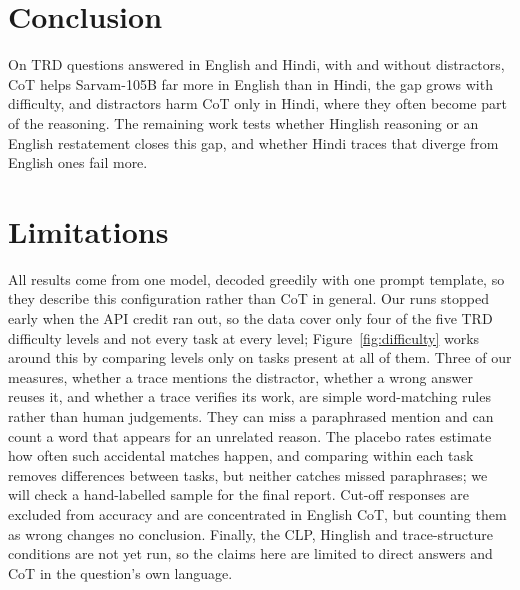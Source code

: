 \documentclass[11pt]{article}
\begin{document}
\section{Conclusion}
\label{sec:conclusion}

On \NQuestions{} TRD questions answered in English and Hindi, with and without distractors, CoT helps Sarvam-105B far more in English than in Hindi, the gap grows with difficulty, and distractors harm CoT only in Hindi, where they often become part of the reasoning. The remaining work tests whether Hinglish reasoning or an English restatement closes this gap, and whether Hindi traces that diverge from English ones fail more.

\section*{Limitations}

All results come from one model, decoded greedily with one prompt template, so they describe this configuration rather than CoT in general. Our runs stopped early when the API credit ran out, so the data cover only four of the five TRD difficulty levels and not every task at every level; Figure~\ref{fig:difficulty} works around this by comparing levels only on tasks present at all of them. Three of our measures, whether a trace mentions the distractor, whether a wrong answer reuses it, and whether a trace verifies its work, are simple word-matching rules rather than human judgements. They can miss a paraphrased mention and can count a word that appears for an unrelated reason. The placebo rates estimate how often such accidental matches happen, and comparing within each task removes differences between tasks, but neither catches missed paraphrases; we will check a hand-labelled sample for the final report. Cut-off responses are excluded from accuracy and are concentrated in English CoT, but counting them as wrong changes no conclusion. Finally, the CLP, Hinglish and trace-structure conditions are not yet run, so the claims here are limited to direct answers and CoT in the question's own language.



\clearpage
\appendix

\end{document}
